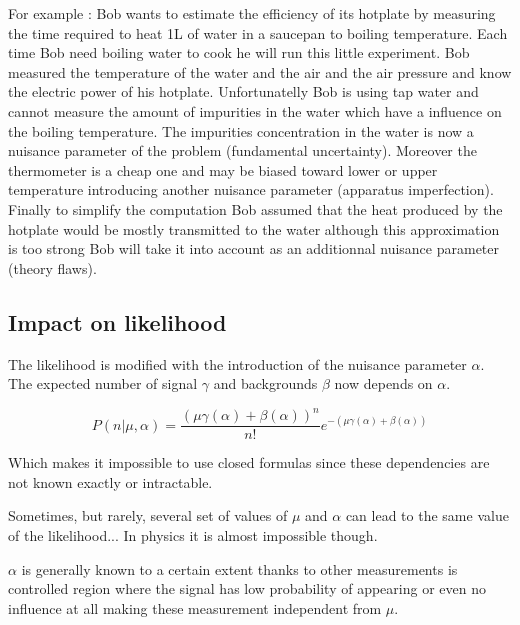 For example : Bob wants to estimate the efficiency of its hotplate by measuring the time required to heat 1L of water in a saucepan to boiling temperature.
Each time Bob need boiling water to cook he will run this little experiment.
Bob measured the temperature of the water and the air and the air pressure and know the electric power of his hotplate.
Unfortunatelly Bob is using tap water and cannot measure the amount of impurities in the water which have a influence on the boiling temperature.
The impurities concentration in the water is now a nuisance parameter of the problem (fundamental uncertainty).
Moreover the thermometer is a cheap one and may be biased toward lower or upper temperature introducing another nuisance parameter (apparatus imperfection).
Finally to simplify the computation Bob assumed that the heat produced by the hotplate would be mostly transmitted to the water although this approximation is too strong Bob will take it into account as an additionnal nuisance parameter (theory flaws).







\subsection{Impact on likelihood} %
\label{sub:impact_on_likelihood}


The likelihood is modified with the introduction of the nuisance parameter $\alpha$.
The expected number of signal $\gamma$ and backgrounds $\beta$ now depends on $\alpha$.

\begin{equation}
	P(n| \mu, \alpha) = \frac{(\mu \gamma(\alpha) +\beta(\alpha))^n }{n!} e^{-(\mu \gamma(\alpha) +\beta(\alpha))}
\end{equation}

Which makes it impossible to use closed formulas since these dependencies are not known exactly or intractable.

Sometimes, but rarely, several set of values of $\mu$ and $\alpha$  can lead to the same value of the likelihood...
In physics it is almost impossible though.

$\alpha$ is generally known to a certain extent thanks to other measurements is controlled region where the signal has low probability of appearing or even no influence at all making these measurement independent from $\mu$.


